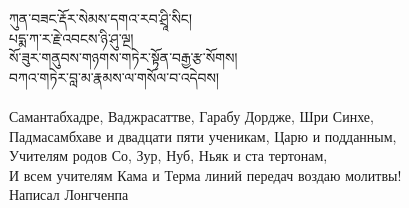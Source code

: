 \ru
{}
\ru


{\ti
ཀུན་བཟང་རྡོར་སེམས་དགའ་རབ་ཤྲཱི་སིང།\\
པདྨ་ཀ་ར་རྗེ་འབངས་ཉི་ཤུ་ལྔ།\\
སོ་ཟུར་གནུབས་གཉགས་གཏེར་སྟོན་བརྒྱ་རྩ་སོགས།\\
བཀའ་གཏེར་བླ་མ་རྣམས་ལ་གསོལ་བ་འདེབས།}\\
\\
\ru
Самантабхадре, Ваджрасаттве, Гарабу Дордже, Шри Синхе,\\
Падмасамбхаве и двадцати пяти ученикам, Царю и подданным,\\
Учителям родов Со, Зур, Нуб, Ньяк и ста тертонам,\\
И всем учителям Кама и Терма линий передач воздаю молитвы!\\
\scriptsize Написал Лонгченпа\normalsize\\
\\



